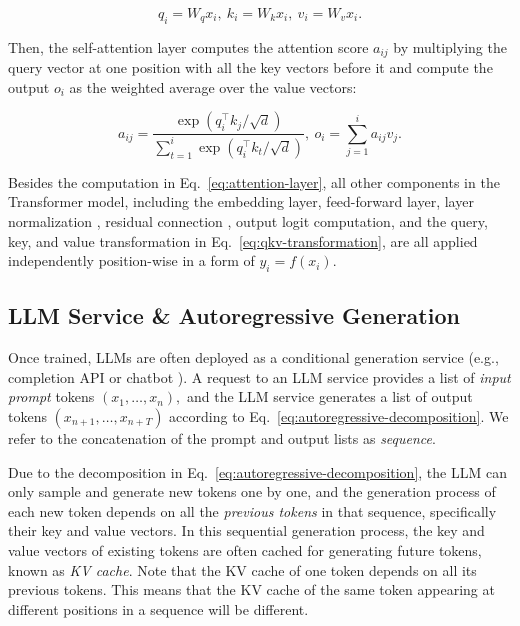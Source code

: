 \begin{equation}
q_i = W_q x_i, \  k_i = W_k x_i, \  v_i = W_v x_i. \label{eq:qkv-transformation}
\end{equation}

Then, the self-attention layer computes the attention score $a_{ij}$ by multiplying the query vector at one position with all the key vectors before it and compute the output $o_i$ as the weighted average over the value vectors:

\begin{equation}
a_{ij} = \frac{\exp(q_i^\top k_j / \sqrt{d})}{\sum_{t=1}^{i}\exp(q_i^\top k_t / \sqrt{d})}, \ o_i = \sum_{j=1}^{i} a_{ij} v_j. \label{eq:attention-layer}
\end{equation}

Besides the computation in Eq.~\ref{eq:attention-layer}, all other components in the Transformer model, including the embedding layer, feed-forward layer, layer normalization \cite{ba2016layer}, residual connection \cite{he2016deep}, output logit computation, and the query, key, and value transformation in Eq.~\ref{eq:qkv-transformation}, are all applied independently position-wise in a form of $y_i = f(x_i).$

\subsection{LLM Service \& Autoregressive Generation}

Once trained, LLMs are often deployed as a conditional generation service (e.g., completion API \cite{openaiapi} or chatbot \cite{chatgpt, bard}). A request to an LLM service provides a list of \emph{input prompt} tokens $(x_1, \ldots, x_n),$ and the LLM service generates a list of output tokens $(x_{n+1}, \ldots, x_{n+T})$ according to Eq.~\ref{eq:autoregressive-decomposition}. We refer to the concatenation of the prompt and output lists as \emph{sequence}. 

Due to the decomposition in Eq.~\ref{eq:autoregressive-decomposition}, the LLM can only sample and generate new tokens one by one, and the generation process of each new token depends on all the \emph{previous tokens} in that sequence, specifically their key and value vectors. In this sequential generation process, the key and value vectors of existing tokens are often cached for generating future tokens, known as \emph{KV cache}. Note that the KV cache of one token depends on all its previous tokens. This means that the KV cache of the same token appearing at different positions in a sequence will be different. 

